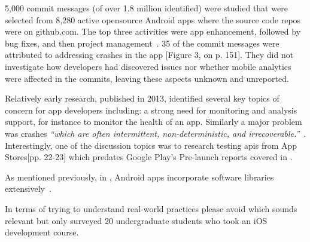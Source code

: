 
5,000 commit messages (of over 1.8 million identified) were studied that were selected from 8,280 active opensource Android apps where the source code repos were on github.com. The top three activities were app enhancement, followed by bug fixes, and then project management~. 35 of the commit messages were attributed to addressing crashes in the app [Figure 3, on p. 151]. They did not investigate how developers had discovered issues nor whether mobile analytics were affected in the commits, leaving these aspects unknown and unreported.

Relatively early research, published in 2013, identified several key topics of concern for app developers including: a strong need for monitoring and analysis support, for instance to monitor the health of an app. Similarly a major problem was crashes \emph{``which are often intermittent, non-deterministic, and irrecoverable.''}~. Interestingly, one of the discussion topics was to research testing \acrshort{api}s from App Stores[pp. 22-23] which predates Google Play's Pre-launch reports covered in .


As mentioned previously, in , Android apps incorporate software libraries extensively~.

In terms of trying to understand real-world practices please avoid \textcite{santos2016_investigating_the_adoption_of_agile_practices_by_20_undergrad_students_in_mobile_app_devt} which sounds relevant but only surveyed 20 undergraduate students who took an iOS development course. 

